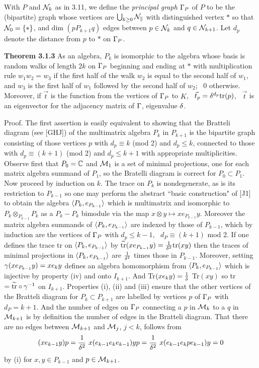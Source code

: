  With $P$ and ${\cal N}_k$ as in 3.11, we
define the {\it principal graph} $\Gamma_P$ of $P$ to be the
(bipartite) graph whose vertices are $\bigcup_{k\geq 0}\cal N_k$
with distinguished vertex $*$ so that ${\cal N}_0=\{*\}$, and
dim $(pP_{k+1}q)$ edges between $p\in{\cal N}_k$ and $q\in{\cal N}_{k+1}$. 
Let $d_p$ denote the distance from $p$ to $*$ on $\Gamma_P$.

\bs\ni
{\bf Theorem 3.1.3} As an algebra, $P_k$ is isomorphic to the
algebra whose basis is random walks of length $2k$ on $\Gamma_P$
beginning and ending at $*$ with multiplication rule
$w_1w_2=w_3$ if the first half of the walk $w_2$ is equal to the
second half of $w_1$, and $w_3$ is the first half of $w_1$ followed
by the second half of $w_2$; \ 0 otherwise. Moreover, if $\vec t$
is the function from the vertices of $\Gamma_P$ to $K$, \
$\vec t_p=\delta^{d_p}{\bf\rm{tr}}(p)$, \ $\vec t$ is an eigenvector for
the adjacency matrix of $\Gamma$, eigenvalue $\delta$.

\bigskip
{\sc Proof.} The first assertion is easily equivalent to showing
that the Bratteli diagram (see [GHJ]) of the multimatrix
algebra $P_k$ in $P_{k+1}$ is the bipartite graph consisting of
those vertices $p$ with $d_p\equiv k$ (mod 2) and $d_p\leq k$,
connected to those with
$d_p\equiv (k+1)$ (mod 2) and $d_p\leq k+1$ with appropriate
multiplicities. Observe first that $P_0=\Bbb C$ and ${\cal M}_1$ is a
set of minimal projections, one for each matrix algebra summand of
$P_1$, so the Bratelli diagram is correct for $P_0\subset P_1$. Now
proceed by induction on $k$. The trace on $P_k$ is nondegenerate,
as is its restriction to $P_{k-1}$ so one may perform the abstract
``basic construction" of [J1] to obtain the algebra
$\langle P_k,e_{P_{k-1}}\rangle$ which is multimatrix and isomorphic to
$P_k\otimes_{P_{k-1}} P_k$ as a $P_k-P_k$ bimodule via the map
$x\otimes y\mapsto xe_{P_{k-1}} y$. Moreover the matrix algebra
summands of $\langle P_k,e_{P_{k-1}}\rangle$ are indexed by those of $P_{k-1}$,
which by induction are the vertices of $\Gamma_P$ with $d_p\leq k-1$, \
$d_P\equiv (k+1)$ mod 2.  If one defines the trace tr on
$\langle P_k,e_{P_{k-1}}\rangle$ by $\widetilde{\bf\rm{tr}}(xe_{P_{k-1}}y)=
\frac{1}{\delta^2} {\bf\rm{tr}}(xy)$ then the traces of minimal
projections in $\langle P_k,e_{P_{k-1}}\rangle$ are $\frac{1}{\delta^2}$ times
those in $P_{k-1}$. Moreover, setting $\gamma(xe_{P_{k-1}}y)=xe_ky$
defines an algebra homomorphism from $\langle P_k,e_{P_{k-1}}\rangle$ which is
injective by property (iv) and onto $I_{k+1}$. And
Tr$(xe_ky)=\frac 1{\delta}$ Tr$(xy)$ so tr
$=\widetilde{\bf\rm{tr}}\circ\gamma^{-1}$ on $I_{k+1}$. Properties (i),
(ii) and (iii) ensure that the other  vertices of the Bratteli
diagram for $P_k\subset P_{k+1}$ are labelled by vertices $p$ of
$\Gamma_P$ with $d_P=k+1$. And the number of edges on $\Gamma_P$ connecting
a $p$ in ${\cal M}_k$ to a $q$ in ${\cal M}_{k+1}$ is by definition the
number of edges in the Bratteli diagram. That there are no edges
between ${\cal M}_{k+1}$ and ${\cal M}_j$, $j < k$, follows from
$$
(xe_{k-1}y)p=\frac{1}{\d^2} \ x(e_{k-1}e_ke_{k-1})yp
= \frac{1}{\d^2} \ x(e_{k-1}e_kpe_{k-1})y=0
$$
by (i) for $x,y\in P_{k-1}$ and $p\in {\cal M}_{k+1}$.

